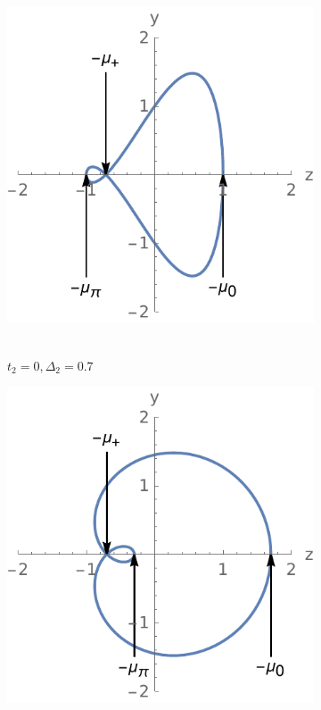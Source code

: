 \documentclass[a4paper]{article}
\begin{document}
\begin{figure}
\begin{subfigure}{0.32\textwidth}
		\includegraphics[width=\textwidth]{Figures/r_curve_2.pdf}~
		\caption{$t_2 =0, \Delta_2 = 0.7$}
		\label{sfig:curve_2}
	\end{subfigure}
	\begin{subfigure}{0.32\textwidth}
		\centering
		\includegraphics[width=\textwidth]{Figures/r_curve_3.pdf}

\end{subfigure}
\end{figure}
\end{document}

